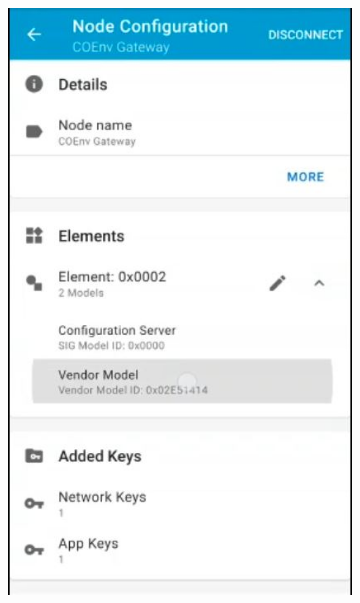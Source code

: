 \documentclass[../monografia.tex]{subfiles}
\begin{document}
\begin{figure}[h]
\begin{subfigure}[b]{0.22\textwidth}
		\includegraphics[width=\textwidth]{mesh-bind-3}
		\label{fig:mesh-bind-3}
	\end{subfigure}
	\begin{subfigure}[b]{0.22\textwidth} 
		\centering

\end{subfigure}
\end{figure}
\end{document}

